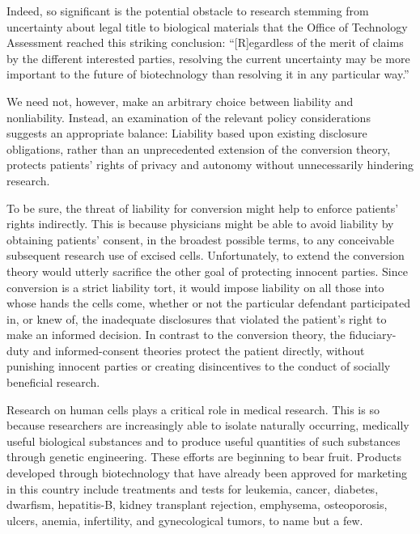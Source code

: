Indeed, so significant is the potential obstacle to research stemming from
uncertainty about legal title to biological materials that the Office of
Technology Assessment reached this striking conclusion: ``[R]egardless of the
merit of claims by the different interested parties, resolving the current
uncertainty may be more important to the future of biotechnology than resolving
it in any particular way.''

We need not, however, make an arbitrary choice between liability and
nonliability. Instead, an examination of the relevant policy considerations
suggests an appropriate balance: Liability based upon existing disclosure
obligations, rather than an unprecedented extension of the conversion theory,
protects patients' rights of privacy and autonomy without unnecessarily
hindering research.

To be sure, the threat of liability for conversion might help to enforce
patients' rights indirectly. This is because physicians might be able to avoid
liability by obtaining patients' consent, in the broadest possible terms, to
any conceivable subsequent research use of excised cells. Unfortunately, to
extend the conversion theory would utterly sacrifice the other goal of
protecting innocent parties. Since conversion is a strict liability tort, it
would impose liability on all those into whose hands the cells come, whether or
not the particular defendant participated in, or knew of, the inadequate
disclosures that violated the patient's right to make an informed decision. In
contrast to the conversion theory, the fiduciary-duty and informed-consent
theories protect the patient directly, without punishing innocent parties or
creating disincentives to the conduct of socially beneficial research.

Research on human cells plays a critical role in medical research. This is so
because researchers are increasingly able to isolate naturally occurring,
medically useful biological substances and to produce useful quantities of such
substances through genetic engineering. These efforts are beginning to bear
fruit. Products developed through biotechnology that have already been approved
for marketing in this country include treatments and tests for leukemia,
cancer, diabetes, dwarfism, hepatitis-B, kidney transplant rejection,
emphysema, osteoporosis, ulcers, anemia, infertility, and gynecological tumors,
to name but a few.

